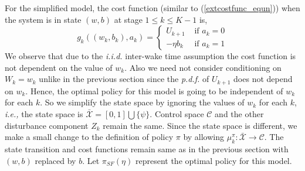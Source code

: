 \documentclass[onecolumn]{IEEEtran}
\begin{document}
For the simplified model, the cost function (similar to (\ref{extcostfunc_equn})) when the system is in state $(w,b)$ at stage $1\le k\le K-1$ is,
\begin{equation}
\label{expcostfunc_equn}
g_k((w_k,b_k),a_k)=\left\{\begin{array}{ll}
                    {U}_{k+1}&\mbox{ if }a_k=0 \\
                    -\eta b_k&\mbox{ if }a_k=1\end{array} \right.
\end{equation}
We observe that due to the \emph{i.i.d.} inter-wake time assumption the cost
function is not dependent on the value of $w_k$. Also we need not
consider conditioning on $W_k=w_k$ unlike in the previous section
since the \emph{p.d.f.} of $U_{k+1}$ does not depend on $w_k$.  Hence, the
optimal policy for this model is going to be independent of $w_k$ for
each $k$.  So we simplify the state space by ignoring the values of
$w_k$ for each $k$, \emph{i.e.,} the state space is
$\mathcal{\bar{X}}=[0,1]\bigcup\{\psi\}$. Control space $\mathcal{C}$
and the other disturbance component ${Z_{k}}$ remain the same.  Since
the state space is different, we make a small change to the definition
of policy $\pi$ by allowing
$\mu_k^{\pi}:\mathcal{\bar{X}}\rightarrow\mathcal{C}$.  The state
transition and cost functions remain same as in the previous section
with $(w,b)$ replaced by $b$. Let $\pi_{SF}(\eta)$ represent the
optimal policy for this model.
\end{document}
